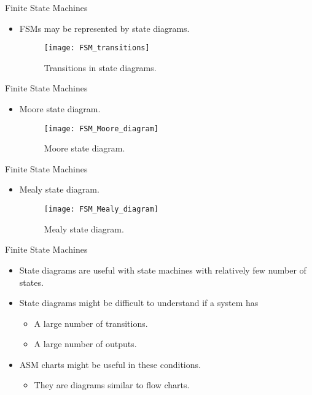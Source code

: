 % 
\begin{frame}{Finite State Machines}{}
  \begin{itemize}
    \item \acp{FSM} may be represented by state diagrams.
    \begin{figure}
      \centering
      \texttt{[image: FSM\_transitions]}
       \caption{Transitions in state diagrams.}
       \label{Figure:FSM_transitions}
    \end{figure}
  \end{itemize}
\end{frame}

% 
\begin{frame}{Finite State Machines}{}
  \begin{itemize}
    \item Moore state diagram.
    \begin{figure}
      \centering
      \texttt{[image: FSM\_Moore\_diagram]}
       \caption{Moore state diagram.}
       \label{Figure:FSM_Moore_diagram}
    \end{figure}
  \end{itemize}
\end{frame}

% 
\begin{frame}{Finite State Machines}{}
  \begin{itemize}
    \item Mealy state diagram.
    \begin{figure}
      \centering
      \texttt{[image: FSM\_Mealy\_diagram]}
       \caption{Mealy state diagram.}
       \label{Figure:FSM_Mealy_diagram}
    \end{figure}
  \end{itemize}
\end{frame}

% 
\begin{frame}{Finite State Machines}{}
  \begin{itemize}
    \item State diagrams are useful with state machines with relatively few number of states.
    \item State diagrams might be difficult to understand if a system has
    \begin{itemize}
      \item A large number of transitions.
      \item A large number of outputs.
    \end{itemize}
    \item \ac{ASM} charts might be useful in these conditions.
    \begin{itemize}
     \item They are diagrams similar to flow charts.
    \end{itemize}
  \end{itemize}
\end{frame}
 
